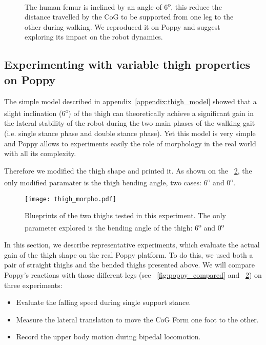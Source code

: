 \begin{figure}[tb]
\centering
    \hfil
    \caption{The human femur is inclined by an angle of 6\textsuperscript{o}, this reduce the distance travelled by the CoG to be supported from one leg to the other during walking. We reproduced it on Poppy and suggest exploring its impact on the robot dynamics.}
    \label{fig:poppy_thigh_experiment}
\end{figure}

\subsection{Experimenting with variable thigh properties on Poppy} %

The simple model described in appendix~\ref{appendix:thigh_model} showed that a slight inclination (6\textsuperscript{o}) of the thigh can theoretically achieve a significant gain in the lateral stability of the robot during the two main phases of the walking gait (i.e. single stance phase and double stance phase).
Yet this model is very simple and Poppy allows to experiments easily the role of morphology in the real world with all its complexity.

Therefore we modified the thigh shape and printed it. As shown on the \figurename~\ref{fig:thigh_drawings}, the only modified paramater is the thigh bending angle, two cases: 6\textsuperscript{o} and 0\textsuperscript{o}.

\begin{figure}[p]
    \begin{center}
        \texttt{[image: thigh\_morpho.pdf]}
    \end{center}
    \caption{Blueprints of the two thighs tested in this experiment. The only parameter explored is the bending angle of the thigh: 6\textsuperscript{o} and 0\textsuperscript{o}}
    \label{fig:thigh_drawings}
\end{figure}

In this section, we describe representative experiments, which evaluate the actual gain of the thigh shape on the real Poppy platform. To do this, we used both a pair of straight thighs and the bended thighs presented above. We will compare Poppy's reactions with those different legs (see \figurename~\ref{fig:poppy_compared} and \figurename~\ref{fig:thigh_drawings}) on three experiments:
\begin{itemize}
    \item Evaluate the falling speed during single support stance.
    \item Measure the lateral translation to move the CoG Form one foot to the other.
    \item Record the upper body motion during bipedal locomotion.
\end{itemize}

